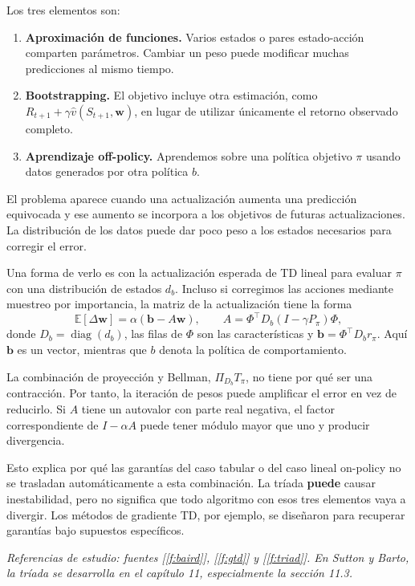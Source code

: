 \documentclass[11pt,a4paper]{article}
\newcommand{\E}{\mathbb{E}}
\begin{document}
Los tres elementos son:
\begin{enumerate}
\item \textbf{Aproximación de funciones.} Varios estados o pares estado-acción comparten parámetros. Cambiar un peso puede modificar muchas predicciones al mismo tiempo.
\item \textbf{Bootstrapping.} El objetivo incluye otra estimación, como $R_{t+1}+\gamma\widehat v(S_{t+1},\mathbf w)$, en lugar de utilizar únicamente el retorno observado completo.
\item \textbf{Aprendizaje off-policy.} Aprendemos sobre una política objetivo $\pi$ usando datos generados por otra política $b$.
\end{enumerate}
El problema aparece cuando una actualización aumenta una predicción equivocada y ese aumento se incorpora a los objetivos de futuras actualizaciones. La distribución de los datos puede dar poco peso a los estados necesarios para corregir el error.

Una forma de verlo es con la actualización esperada de TD lineal para evaluar $\pi$ con una distribución de estados $d_b$. Incluso si corregimos las acciones mediante muestreo por importancia, la matriz de la actualización tiene la forma
\[
\E[\Delta\mathbf w]=\alpha(\mathbf b-A\mathbf w),\qquad
A=\Phi^\top D_b(I-\gamma P_\pi)\Phi,
\]
donde $D_b=\operatorname{diag}(d_b)$, las filas de $\Phi$ son las características y $\mathbf b=\Phi^\top D_b r_\pi$. Aquí $\mathbf b$ es un vector, mientras que $b$ denota la política de comportamiento.

La combinación de proyección y Bellman, $\Pi_{D_b}T_\pi$, no tiene por qué ser una contracción. Por tanto, la iteración de pesos puede amplificar el error en vez de reducirlo. Si $A$ tiene un autovalor con parte real negativa, el factor correspondiente de $I-\alpha A$ puede tener módulo mayor que uno y producir divergencia.

Esto explica por qué las garantías del caso tabular o del caso lineal on-policy no se trasladan automáticamente a esta combinación. La tríada \textbf{puede} causar inestabilidad, pero no significa que todo algoritmo con esos tres elementos vaya a divergir. Los métodos de gradiente TD, por ejemplo, se diseñaron para recuperar garantías bajo supuestos específicos.

\textit{Referencias de estudio: fuentes [\ref{f:baird}], [\ref{f:gtd}] y [\ref{f:triad}]. En Sutton y Barto, la tríada se desarrolla en el capítulo 11, especialmente la sección 11.3.}
\end{document}
